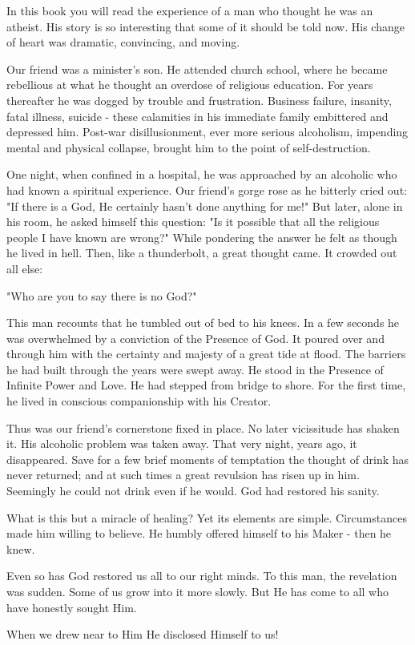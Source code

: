 \begin{biblechapter}
    In this book you will read the experience of a man who thought he was an atheist. 
His story is so interesting that some of it should be told now. 
His change of heart was dramatic, convincing, and moving.

Our friend was a minister's son. 
He attended church school, where he became rebellious at what he thought an overdose of religious education. 
For years thereafter he was dogged by trouble and frustration. 
Business failure, insanity, fatal illness, suicide - 
these calamities in his immediate family embittered and depressed him. 
Post-war disillusionment, ever more serious alcoholism, impending mental and physical collapse, brought him to the point of self-destruction.

One night, when confined in a hospital, he was approached by an alcoholic who had known a spiritual experience. 
Our friend's gorge rose as he bitterly cried out: 
"If there is a God, He certainly hasn't done anything for me!" 
But later, alone in his room, he asked himself this question: 
"Is it possible that all the religious people I have known are wrong?" 
While pondering the answer he felt as though he lived in hell. 
Then, like a thunderbolt, a great thought came. 
It crowded out all else:

"Who are you to say there is no God?"

This man recounts that he tumbled out of bed to his knees. 
In a few seconds he was overwhelmed by a conviction of the Presence of God. 
It poured over and through him with the certainty and majesty of a great tide at flood. 
The barriers he had built through the years were swept away. 
He stood in the Presence of Infinite Power and Love. 
He had stepped from bridge to shore. 
For the first time, he lived in conscious companionship with his Creator.

Thus was our friend's cornerstone fixed in place. 
No later vicissitude has shaken it. 
His alcoholic problem was taken away. 
That very night, years ago, it disappeared. 
Save for a few brief moments of temptation the thought of drink has never returned; 
and at such times a great revulsion has risen up in him. 
Seemingly he could not drink even if he would. 
God had restored his sanity.
\end{biblechapter}


\begin{biblechapter}
    What is this but a miracle of healing? 
Yet its elements are simple. 
Circumstances made him willing to believe. 
He humbly offered himself to his Maker - then he knew.

Even so has God restored us all to our right minds. 
To this man, the revelation was sudden. 
Some of us grow into it more slowly. 
But He has come to all who have honestly sought Him.

When we drew near to Him He disclosed Himself to us!
\end{biblechapter}

